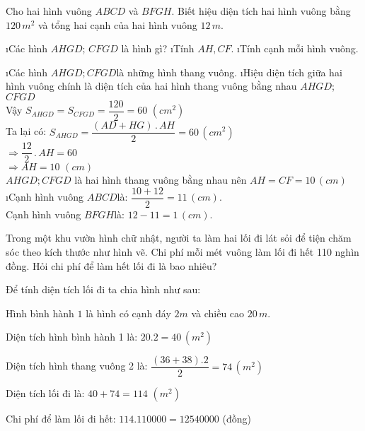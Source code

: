 \begin{bt}
	Cho hai hình vuông $ABCD$ và $BFGH$. Biết hiệu diện tích hai hình vuông bằng $120\,m^2$ và tổng hai cạnh của hai hình vuông $12\, m$. 
	\begin{enumerate}[a), leftmargin=*]
		\i Các hình $AHGD$; $CFGD$ là hình gì?
		\i Tính $AH,CF$.
		\i Tính cạnh mỗi hình vuông.
	\end{enumerate}
	\begin{loigiaichuong38}
		\begin{enumerate}[a), leftmargin=*]
			\i Các hình $AHGD;CFGD$là những hình thang vuông.
			\i Hiệu diện tích giữa hai hình vuông chính là diện tích của hai hình thang vuông bằng nhau $AHGD$; $CFGD$\\
			Vậy ${{S}_{AHGD}}={{S}_{CFGD}}=\dfrac{120}{2}=60\,\,(cm^2)$\\
			Ta lại có: ${{S}_{AHGD}}=\dfrac{(AD+HG)\,.\,AH}{2}=60\,(cm^2)$\\
			$\Rightarrow \dfrac{12}{2}\,.\,AH=60$ \\ 
			$\Rightarrow AH=10\,\,(cm)$ \\ 
			$AHGD;CFGD$ là hai hình thang vuông bằng nhau nên $AH=CF=10\,(cm)$
			\i Cạnh hình vuông $ABCD$là: $\dfrac{10+12}{2}=11\,(cm)$.\\
			Cạnh hình vuông $BFGH$là: $12-11=1\,(cm)$.
		\end{enumerate}
	\end{loigiaichuong38}
\end{bt}
\begin{bt}
	Trong một khu vườn hình chữ nhật, người ta làm hai lối đi lát sỏi để tiện chăm sóc theo kích thước như hình vẽ. Chi phí mỗi mét vuông làm lối đi hết 110 nghìn đồng. Hỏi chi phí để làm hết lối đi là bao nhiêu?
	\begin{loigiaichuong38}
		Để tính diện tích lối đi ta chia hình như sau: 
		
		Hình bình hành $1$ là hình có cạnh đáy $2m$ và chiều cao $20\,m$.
		
		Diện tích hình bình hành 1 là: $20.2=40\,(m^2)$
		
		Diện tích hình thang vuông 2 là: $\dfrac{(36+38).2}{2}=74\,(m^2)$
		
		Diện tích lối đi là: $40+74=114\,\,(m^2)$
		
		Chi phí để làm lối đi hết: $114.110000=12540000$ (đồng)
	\end{loigiaichuong38}
\end{bt}
